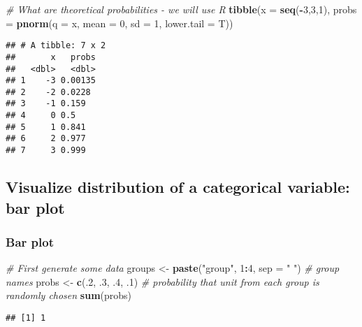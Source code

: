 \documentclass[
]{article}
\newenvironment{Shaded}{\begin{snugshade}}{\end{snugshade}}
\newcommand{\AttributeTok}[1]{\textcolor[rgb]{0.13,0.29,0.53}{#1}}
\newcommand{\CommentTok}[1]{\textcolor[rgb]{0.56,0.35,0.01}{\textit{#1}}}
\newcommand{\DecValTok}[1]{\textcolor[rgb]{0.00,0.00,0.81}{#1}}
\newcommand{\FunctionTok}[1]{\textcolor[rgb]{0.13,0.29,0.53}{\textbf{#1}}}
\newcommand{\NormalTok}[1]{#1}
\newcommand{\OtherTok}[1]{\textcolor[rgb]{0.56,0.35,0.01}{#1}}
\newcommand{\SpecialCharTok}[1]{\textcolor[rgb]{0.81,0.36,0.00}{\textbf{#1}}}
\newcommand{\StringTok}[1]{\textcolor[rgb]{0.31,0.60,0.02}{#1}}
\begin{document}
\begin{Shaded}
\begin{Highlighting}[]
\CommentTok{\# What are theoretical probabilities {-} we will use R}
\FunctionTok{tibble}\NormalTok{(}\AttributeTok{x =} \FunctionTok{seq}\NormalTok{(}\SpecialCharTok{{-}}\DecValTok{3}\NormalTok{,}\DecValTok{3}\NormalTok{,}\DecValTok{1}\NormalTok{),}
       \AttributeTok{probs =} \FunctionTok{pnorm}\NormalTok{(}\AttributeTok{q =}\NormalTok{ x, }\AttributeTok{mean =} \DecValTok{0}\NormalTok{, }\AttributeTok{sd =} \DecValTok{1}\NormalTok{, }\AttributeTok{lower.tail =}\NormalTok{ T))}
\end{Highlighting}
\end{Shaded}

\begin{verbatim}
## # A tibble: 7 x 2
##       x   probs
##   <dbl>   <dbl>
## 1    -3 0.00135
## 2    -2 0.0228 
## 3    -1 0.159  
## 4     0 0.5    
## 5     1 0.841  
## 6     2 0.977  
## 7     3 0.999
\end{verbatim}

\subsection{Visualize distribution of a categorical variable: bar
plot}\label{visualize-distribution-of-a-categorical-variable-bar-plot}

\subsubsection{Bar plot}\label{bar-plot}

\begin{Shaded}
\begin{Highlighting}[]
\CommentTok{\#   First generate some data}
\NormalTok{groups }\OtherTok{\textless{}{-}} \FunctionTok{paste}\NormalTok{(}\StringTok{"group"}\NormalTok{, }\DecValTok{1}\SpecialCharTok{:}\DecValTok{4}\NormalTok{, }\AttributeTok{sep =} \StringTok{" "}\NormalTok{) }\CommentTok{\# group names}
\NormalTok{probs }\OtherTok{\textless{}{-}} \FunctionTok{c}\NormalTok{(.}\DecValTok{2}\NormalTok{, .}\DecValTok{3}\NormalTok{, .}\DecValTok{4}\NormalTok{, .}\DecValTok{1}\NormalTok{) }\CommentTok{\# probability that unit from  each group is randomly chosen}
\FunctionTok{sum}\NormalTok{(probs)}
\end{Highlighting}
\end{Shaded}

\begin{verbatim}
## [1] 1
\end{verbatim}
\end{document}
